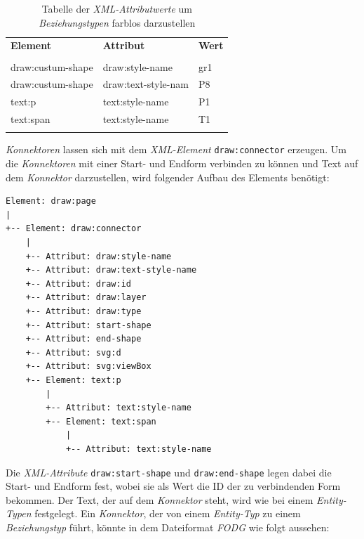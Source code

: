 \begin{table}[H]
	\centering
	\begin{tabular}{lll}
		\textbf{Element} & \textbf{Attribut}  & \textbf{Wert} \\
		\\
		draw:custum-shape & draw:style-name           & gr1             \\
		draw:custum-shape & draw:text-style-nam      & P8            \\
		text:p & text:style-name       & P1             \\
		text:span & text:style-name       & T1             \\
		\\
	\end{tabular}
	
	\caption{Tabelle der \textit{XML-Attributwerte} um \textit{Beziehungstypen} farblos darzustellen}
	\label{tbl:beispieltabelle8}
	
\end{table}
\noindent
\textit{Konnektoren} lassen sich mit dem \textit{XML-Element} \verb|draw:connector| erzeugen.
Um die \textit{Konnektoren} mit einer Start- und Endform verbinden zu können und Text auf dem \textit{Konnektor} darzustellen, wird folgender Aufbau des Elements benötigt:
\begin{verbatim}
Element: draw:page
|
+-- Element: draw:connector
    |
    +-- Attribut: draw:style-name
    +-- Attribut: draw:text-style-name
    +-- Attribut: draw:id
    +-- Attribut: draw:layer
    +-- Attribut: draw:type
    +-- Attribut: start-shape
    +-- Attribut: end-shape
    +-- Attribut: svg:d
    +-- Attribut: svg:viewBox
    +-- Element: text:p
        |
        +-- Attribut: text:style-name
        +-- Element: text:span
            |
            +-- Attribut: text:style-name

\end{verbatim}
\hon{}
\noindent
Die \textit{XML-Attribute} \verb|draw:start-shape| und \verb|draw:end-shape| legen dabei die Start- und Endform fest, wobei sie als Wert die ID der zu verbindenden Form bekommen. Der Text, der auf dem \textit{Konnektor} steht, wird wie bei einem \textit{Entity-Typen} festgelegt. 
\noindent
Ein \textit{Konnektor}, der von einem \textit{Entity-Typ} zu einem \textit{Beziehungstyp} führt, könnte in dem Dateiformat \textit{FODG} wie folgt aussehen:

